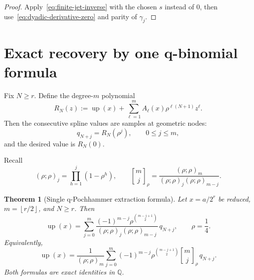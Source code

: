 \documentclass[11pt,a4paper]{article}
\newtheorem{theorem}{Theorem}[section]
\theoremstyle{remark}
\newcommand{\Q}{\mathbb{Q}}
\newcommand{\up}{\operatorname{up}}
\newcommand{\qbinom}[3]{\genfrac{[}{]}{0pt}{}{#1}{#2}_{#3}}
\newcommand{\floor}[1]{\left\lfloor #1\right\rfloor}
\begin{document}
\begin{proof}
Apply~\eqref{eq:finite-jet-inverse} with the chosen $s$ instead of $0$, then
use~\eqref{eq:dyadic-derivative-zero} and parity of $\gamma_j$.
\end{proof}

\section{Exact recovery by one q-binomial formula}
\label{sec:extraction}

Fix $N\ge r$.  Define the degree-$m$ polynomial
\begin{equation}
 R_N(z):=\up(x)+\sum_{\ell=1}^{m}
 A_\ell(x)\rho^{\ell(N+1)}z^\ell.
 \label{eq:RN}
\end{equation}
Then the consecutive spline values are samples at geometric nodes:
\begin{equation}
 q_{N+j}=R_N(\rho^j),
 \qquad 0\le j\le m,
 \label{eq:geometric-samples}
\end{equation}
and the desired value is $R_N(0)$.

Recall
\begin{equation}
 (\rho;\rho)_j=\prod_{h=1}^{j}(1-\rho^h),
 \qquad
 \qbinom{m}{j}{\rho}
 =\frac{(\rho;\rho)_m}
 {(\rho;\rho)_j(\rho;\rho)_{m-j}}.
 \label{eq:qbinomial-definition}
\end{equation}

\begin{theorem}[Single q-Pochhammer extraction formula]
\label{thm:single-extraction}
Let $x=a/2^r$ be reduced, $m=\floor{r/2}$, and $N\ge r$.  Then
\begin{equation}
 \boxed{
 \up(x)=\sum_{j=0}^{m}
 \frac{(-1)^{m-j}\rho^{\binom{m-j+1}{2}}}
 {(\rho;\rho)_j(\rho;\rho)_{m-j}}\,q_{N+j},
 \qquad \rho=\frac14. }
 \label{eq:extraction-pochhammer}
\end{equation}
Equivalently,
\begin{equation}
 \boxed{
 \up(x)=\frac1{(\rho;\rho)_m}
 \sum_{j=0}^{m}(-1)^{m-j}
 \rho^{\binom{m-j+1}{2}}
 \qbinom{m}{j}{\rho}\,q_{N+j}. }
 \label{eq:extraction-qbinomial}
\end{equation}
Both formulas are exact identities in $\Q$.
\end{theorem}
\end{document}
